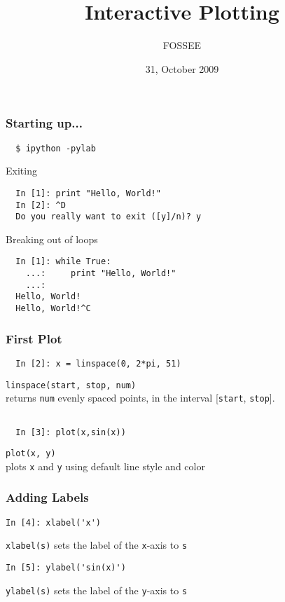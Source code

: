 \documentclass[14pt,compress]{beamer}
\title[]{Interactive Plotting}
\author[FOSSEE] {FOSSEE}
\institute[IIT Bombay] {Department of Aerospace Engineering\\IIT Bombay}
\date[] {31, October 2009}
\newcommand{\typ}[1]{\lstinline{#1}}
\begin{document}
\begin{frame}
  \maketitle
\end{frame}



\begin{frame}[fragile]
\frametitle{Starting up...}
\begin{verbatim}
  $ ipython -pylab  
\end{verbatim}
Exiting
\begin{lstlisting}     
  In [1]: print "Hello, World!"
  In [2]: ^D
  Do you really want to exit ([y]/n)? y
\end{lstlisting}
Breaking out of loops
\begin{lstlisting}     
  In [1]: while True:
    ...:     print "Hello, World!"
    ...:     
  Hello, World!
  Hello, World!^C
\end{lstlisting}
\end{frame}

\begin{frame}[fragile]
\frametitle{First Plot}
\begin{lstlisting}
  In [2]: x = linspace(0, 2*pi, 51)
\end{lstlisting}
\typ{linspace(start, stop, num)} \\
returns \typ{num} evenly spaced points, in the interval [\typ{start}, \typ{stop}].
\begin{lstlisting}

  In [3]: plot(x,sin(x))
\end{lstlisting}
\typ{plot(x, y)}\\
plots \typ{x} and \typ{y} using default line style and color
\end{frame}

\begin{frame}[fragile]
\frametitle{Adding Labels}
  \begin{lstlisting}
In [4]: xlabel('x')
  \end{lstlisting}
\typ{xlabel(s)} sets the label of the \typ{x}-axis to \typ{s}

  \begin{lstlisting}
In [5]: ylabel('sin(x)')
  \end{lstlisting}
\typ{ylabel(s)} sets the label of the \typ{y}-axis to \typ{s}
\end{frame}
\end{document}
